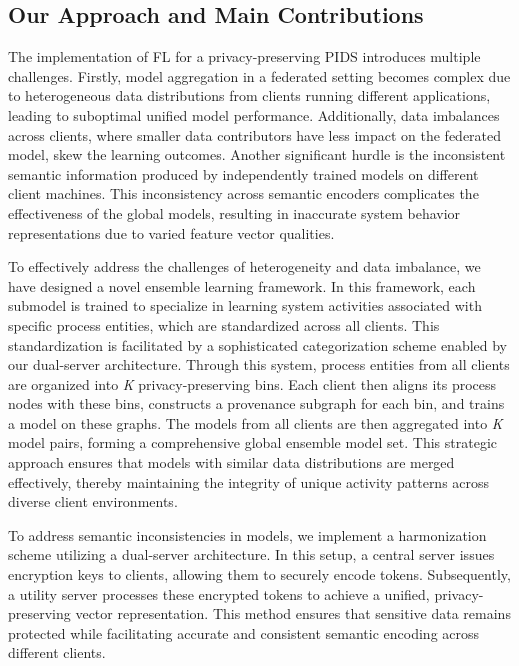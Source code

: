 \subsection{Our Approach and Main Contributions}

The implementation of FL for a privacy-preserving PIDS introduces multiple challenges. Firstly, model aggregation in a federated setting becomes complex due to heterogeneous data distributions from clients running different applications, leading to suboptimal unified model performance. Additionally, data imbalances across clients, where smaller data contributors have less impact on the federated model, skew the learning outcomes. Another significant hurdle is the inconsistent semantic information produced by independently trained \wordvec models on different client machines. This inconsistency across semantic encoders complicates the effectiveness of the global models, resulting in inaccurate system behavior representations due to varied feature vector qualities.



To effectively address the challenges of heterogeneity and data imbalance, we have designed a novel ensemble learning framework. In this framework, each submodel is trained to specialize in learning system activities associated with specific process entities, which are standardized across all clients. This standardization is facilitated by a sophisticated categorization scheme enabled by our dual-server architecture. Through this system, process entities from all clients are organized into \textit{K} privacy-preserving bins. Each client then aligns its process nodes with these bins, constructs a provenance subgraph for each bin, and trains a \gnnshort model on these graphs. The models from all clients are then aggregated into \textit{K} model pairs, forming a comprehensive global ensemble model set. This strategic approach ensures that models with similar data distributions are merged effectively, thereby maintaining the integrity of unique activity patterns across diverse client environments.

To address semantic inconsistencies in \wordvec models, we implement a \wordvec harmonization scheme utilizing a dual-server architecture. In this setup, a central server issues encryption keys to clients, allowing them to securely encode \wordvec tokens. Subsequently, a utility server processes these encrypted tokens to achieve a unified, privacy-preserving vector representation. This method ensures that sensitive data remains protected while facilitating accurate and consistent semantic encoding across different clients.


